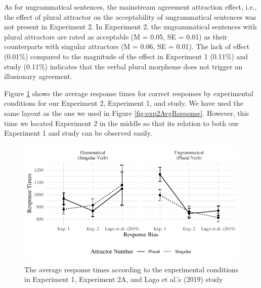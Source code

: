 As for ungrammatical sentences, the mainstream agreement attraction effect, i.e., the effect of plural attractor on the acceptability of ungrammatical sentences was not present in Experiment 2. In Experiment 2, the ungrammatical sentences with plural attractors are rated as acceptable (M = 0.05, SE = 0.01) as their counterparts with singular attractors (M = 0.06, SE = 0.01). The lack of effect (0.01\%) compared to the magnitude of the effect in Experiment 1 (0.11\%) and \cites{LagoEtAl2019} study (0.11\%) indicates that the verbal plural morpheme does not trigger an illusionary agreement.

Figure \ref{fig:exp2RT} shows the average response times for correct responses by experimental conditions for our Experiment 2, Experiment 1, and \cites{LagoEtAl2019} study. We have used the same layout as the one we used in Figure \ref{fig:exp2AvgResponse}. However, this time we located Experiment 2 in the middle so that its relation to both our Experiment 1 and \cites{LagoEtAl2019} study can be observed easily.

\begin{knitrout}
\color{fgcolor}\begin{figure}[hbt!]

{\centering \includegraphics[width=\linewidth]{figure/exp2RT-1} 

}

\caption[The average response times according to the experimental conditions in Experiment 1, Experiment 2A, and Lago et al.'s (2019) study]{The average response times according to the experimental conditions in Experiment 1, Experiment 2A, and Lago et al.'s (2019) study}\label{fig:exp2RT}
\end{figure}

\end{knitrout}

